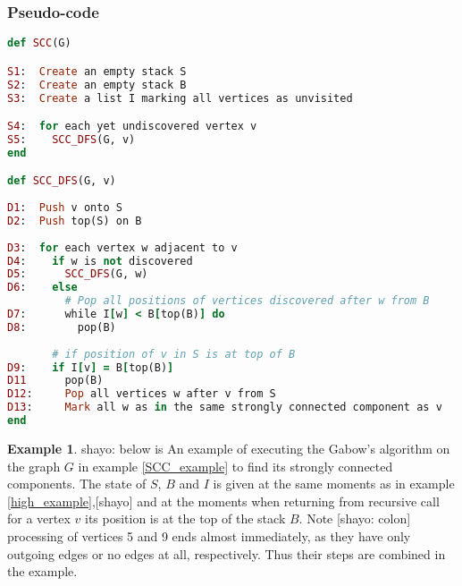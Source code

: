 \documentclass{report}
\theoremstyle{plain}
\theoremstyle{definition}
\newtheorem{example}{Example}
\theoremstyle{remark}
\numberwithin{definition}{chapter}
\numberwithin{example}{chapter}
\numberwithin{figure}{chapter}
\begin{document}
{{{{{{{{{\subsubsection*{Pseudo-code}

\begin{lstlisting}[language=Ruby]
def SCC(G)

S1:  Create an empty stack S
S2:  Create an empty stack B
S3:  Create a list I marking all vertices as unvisited

S4:  for each yet undiscovered vertex v
S5:    SCC_DFS(G, v)
end

def SCC_DFS(G, v)
  
D1:  Push v onto S
D2:  Push top(S) on B
  
D3:  for each vertex w adjacent to v
D4:    if w is not discovered
D5:      SCC_DFS(G, w)
D6:    else
         # Pop all positions of vertices discovered after w from B
D7:      while I[w] < B[top(B)] do
D8:        pop(B)
  
       # if position of v in S is at top of B
D9:    if I[v] = B[top(B)]
D11      pop(B)
D12:     Pop all vertices w after v from S
D13:     Mark all w as in the same strongly connected component as v
end
\end{lstlisting}

\begin{example}

{shayo: below is }An example of executing the Gabow's algorithm on the graph $G$ in example \ref{SCC_example} to find its strongly connected components. The state of $S$, $B$ and $I$ is given at the same moments as in example \ref{high_example},[shayo] and at the moments when  
returning from recursive call for a vertex $v$ its position is at the top of the stack $B$. Note [shayo: colon] processing of vertices 5 and 9 ends almost immediately, as they have only outgoing edges or no edges at all, respectively. Thus their steps are combined in the example.

\begin{figure}[h]

\begin{minipage}[h]{0.24\textwidth}


\end{minipage}
\end{figure}
\end{example}}}}}}}}}}
\end{document}
